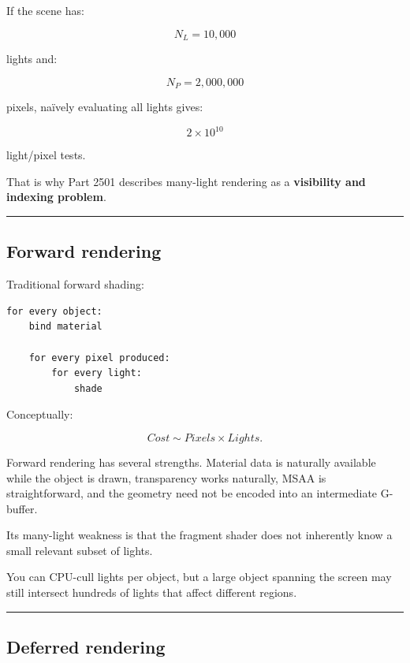 If the scene has:

\[
N_L=10,000
\]

lights and:

\[
N_P=2,000,000
\]

pixels, naïvely evaluating all lights gives:

\[
2\times10^{10}
\]

light/pixel tests.

That is why Part 2501 describes many-light rendering as a \textbf{visibility and indexing problem}.

\begin{center}\rule{0.5\linewidth}{0.5pt}\end{center}

\subsection{Forward rendering}\label{04-visual-computing-ii-ch040-forward-rendering}

Traditional forward shading:

\begin{verbatim}
for every object:
    bind material

    for every pixel produced:
        for every light:
            shade
\end{verbatim}

Conceptually:

\[
Cost
\sim
Pixels\times Lights.
\]

Forward rendering has several strengths. Material data is naturally available while the object is drawn, transparency works naturally, MSAA is straightforward, and the geometry need not be encoded into an intermediate G-buffer.

Its many-light weakness is that the fragment shader does not inherently know a small relevant subset of lights.

You can CPU-cull lights per object, but a large object spanning the screen may still intersect hundreds of lights that affect different regions.

\begin{center}\rule{0.5\linewidth}{0.5pt}\end{center}

\subsection{Deferred rendering}\label{04-visual-computing-ii-ch040-deferred-rendering}

